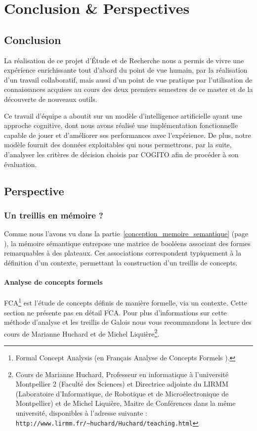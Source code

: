 \clearemptydoublepage
\chapter{Conclusion \& Perspectives}

\section{Conclusion}
La réalisation de ce projet d'Étude et de Recherche nous a permis de vivre une expérience enrichissante tout d'abord du point de vue humain, par la réalisation d'un travail collaboratif, mais aussi d'un point de vue pratique par l'utilisation de connaissances acquises au cours des deux premiers semestres de ce master et de la découverte de nouveaux outils.

Ce  travail d'équipe a aboutit sur un modèle d'intelligence artificielle ayant une approche cognitive, dont nous avons réalisé une implémentation fonctionnelle capable de jouer et d'améliorer ses performances avec l'expérience. De plus, notre modèle fournit des données exploitables qui nous permettrons, par la suite, d'analyser les critères de décision choisis par COGITO afin de procéder à son évaluation.

\section{Perspective}
\subsection{Un treillis en mémoire ?}
Comme nous l'avons vu dans la partie~\ref{conception_memoire_semantique} (page \pageref{conception_memoire_semantique}), la mémoire sémantique entrepose une matrice de booléens associant des formes remarquables à des plateaux. Ces associations correspondent typiquement à la définition d'un contexte, permettant la construction d'un treillis de concepts.

\subsubsection{Analyse de concepts formels}
FCA\footnote{Formal Concept Analysis (en Français \og Analyse de Concepts Formels \fg{}).} est l'étude de concepts définis de manière formelle, via un contexte. Cette section ne présente pas en détail FCA. Pour plus d'informations sur cette méthode d'analyse et les treillis de Galois nous vous recommandons la lecture des cours de Marianne Huchard et de Michel Liquière\footnote{Cours de Marianne Huchard, Professeur en informatique à l'université Montpellier 2 (Faculté des Sciences) et Directrice adjointe du LIRMM (Laboratoire d'Informatique, de Robotique et de Microélectronique de Montpellier) et de Michel Liquière, Maitre de Conférences dans la même université, disponibles à l'adresse suivante : \texttt{http://www.lirmm.fr/\textasciitilde huchard/Huchard/teaching.html}}.

